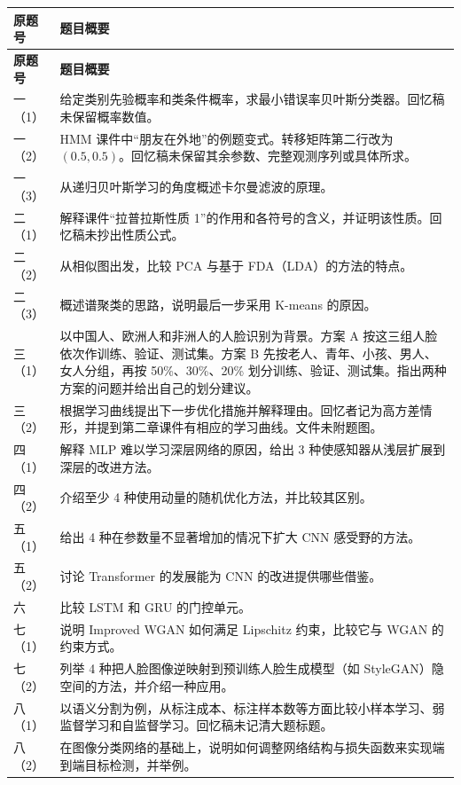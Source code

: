 \documentclass[UTF8,a4paper,zihao=-4,fontset=fandol]{ctexart}
\begin{document}
\begingroup
\small
\renewcommand{\arraystretch}{1.17}
\begin{longtable}{L{.14}L{.86}}
\toprule
{}
\textbf{原题号} & \textbf{题目概要} \\
\midrule
\endfirsthead
\toprule
{}
\textbf{原题号} & \textbf{题目概要} \\
\midrule
\endhead
\midrule
\endfoot
\bottomrule
\endlastfoot
一（1） & 给定类别先验概率和类条件概率，求最小错误率贝叶斯分类器。回忆稿未保留概率数值。 \\
\addlinespace[.16em]
一（2） & HMM 课件中“朋友在外地”的例题变式。转移矩阵第二行改为 $(0.5, 0.5)$。回忆稿未保留其余参数、完整观测序列或具体所求。 \\
\addlinespace[.16em]
一（3） & 从递归贝叶斯学习的角度概述卡尔曼滤波的原理。 \\
\addlinespace[.16em]
二（1） & 解释课件“拉普拉斯性质 1”的作用和各符号的含义，并证明该性质。回忆稿未抄出性质公式。 \\
\addlinespace[.16em]
二（2） & 从相似图出发，比较 PCA 与基于 FDA（LDA）的方法的特点。 \\
\addlinespace[.16em]
二（3） & 概述谱聚类的思路，说明最后一步采用 K-means 的原因。 \\
\addlinespace[.16em]
三（1） & 以中国人、欧洲人和非洲人的人脸识别为背景。方案 A 按这三组人脸依次作训练、验证、测试集。方案 B 先按老人、青年、小孩、男人、女人分组，再按 50\%、30\%、20\% 划分训练、验证、测试集。指出两种方案的问题并给出自己的划分建议。 \\
\addlinespace[.16em]
三（2） & 根据学习曲线提出下一步优化措施并解释理由。回忆者记为高方差情形，并提到第二章课件有相应的学习曲线。文件未附题图。 \\
\addlinespace[.16em]
四（1） & 解释 MLP 难以学习深层网络的原因，给出 3 种使感知器从浅层扩展到深层的改进方法。 \\
\addlinespace[.16em]
四（2） & 介绍至少 4 种使用动量的随机优化方法，并比较其区别。 \\
\addlinespace[.16em]
五（1） & 给出 4 种在参数量不显著增加的情况下扩大 CNN 感受野的方法。 \\
\addlinespace[.16em]
五（2） & 讨论 Transformer 的发展能为 CNN 的改进提供哪些借鉴。 \\
\addlinespace[.16em]
六 & 比较 LSTM 和 GRU 的门控单元。 \\
\addlinespace[.16em]
七（1） & 说明 Improved WGAN 如何满足 Lipschitz 约束，比较它与 WGAN 的约束方式。 \\
\addlinespace[.16em]
七（2） & 列举 4 种把人脸图像逆映射到预训练人脸生成模型（如 StyleGAN）隐空间的方法，并介绍一种应用。 \\
\addlinespace[.16em]
八（1） & 以语义分割为例，从标注成本、标注样本数等方面比较小样本学习、弱监督学习和自监督学习。回忆稿未记清大题标题。 \\
\addlinespace[.16em]
八（2） & 在图像分类网络的基础上，说明如何调整网络结构与损失函数来实现端到端目标检测，并举例。 \\
\end{longtable}
\endgroup
\end{document}
